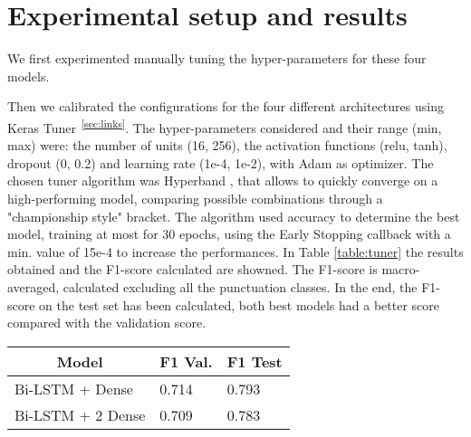 \documentclass[11pt]{article}
\begin{document}
\section{Experimental setup and results}
\label{sec:results}


We first experimented manually tuning the hyper-parameters for these four models.

Then we calibrated the configurations for the four different architectures using 
Keras Tuner\textsuperscript{~\ref{sec:links}}. The hyper-parameters considered and their range (min, max) were: the number of units (16, 256), the activation functions (relu, tanh), dropout (0, 0.2) and learning rate (1e-4, 1e-2), with Adam as optimizer. 
The chosen tuner algorithm was Hyperband \cite{arxiv.1603.06560}, that allows to quickly converge on a high-performing model, comparing possible combinations through a "championship style" bracket. The algorithm used accuracy to determine the best model, training at most for 30 epochs, using the Early Stopping callback with a min. value of 15e-4 to increase the performances. 
In Table \ref{table:tuner} the results obtained and the F1-score calculated are showned. The F1-score is macro-averaged, calculated excluding all the punctuation classes.  
In the end, the F1-score on the test set has been calculated, both best models had a better score compared with the validation score. 

\begin{table}[!h]
\begin{tabular}{l|l|l}
\multicolumn{1}{c|}{\textbf{Model}}       & \textbf{F1 Val.} & \multicolumn{1}{c}{\textbf{F1 Test}} \\ \hline
Bi-LSTM + Dense     & 0.714            & 0.793                                \\
Bi-LSTM + 2 Dense   & 0.709            & 0.783                               
\end{tabular}
\end{table}
\end{document}
